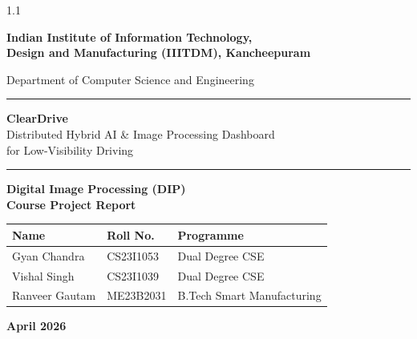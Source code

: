 \documentclass[12pt, a4paper]{article}
\begin{document}
\begin{titlepage}
  \begin{spacing}{1.1}
  \centering
  
  \vspace*{-1.0cm}

  \vspace{0.4cm}
  {\LARGE \textbf{Indian Institute of Information Technology,}\\[5pt]
           \textbf{Design and Manufacturing (IIITDM), Kancheepuram}}

  \vspace{0.2cm}
  {\large Department of Computer Science and Engineering}

  \vspace{0.6cm}
  \textcolor{blue!60!black}{\rule{\linewidth}{2pt}}
  \vspace{0.3cm}

  {\Huge \textbf{ClearDrive}}\\[8pt]
  {\Large Distributed Hybrid AI \& Image Processing Dashboard\\
          for Low-Visibility Driving}

  \vspace{0.3cm}
  \textcolor{blue!60!black}{\rule{\linewidth}{2pt}}

  \vspace{0.6cm}
  {\large \textbf{Digital Image Processing (DIP)\\Course Project Report}}

  \vspace{0.6cm}
  \begin{tcolorbox}[
    colback=blue!5!white,
    colframe=blue!50!black,
    width=0.85\linewidth,
    arc=4pt
  ]
    \centering
    \begin{tabular}{lll}
      \toprule
      \textbf{Name} & \textbf{Roll No.} & \textbf{Programme}\\
      \midrule
      Gyan Chandra   & CS23I1053 & Dual Degree CSE\\
      Vishal Singh   & CS23I1039 & Dual Degree CSE\\
      Ranveer Gautam & ME23B2031 & B.Tech Smart Manufacturing\\
      \bottomrule
    \end{tabular}
  \end{tcolorbox}

  \vfill
  {\large \textbf{April 2026}}
  
  \end{spacing}
\end{titlepage}
\end{document}
